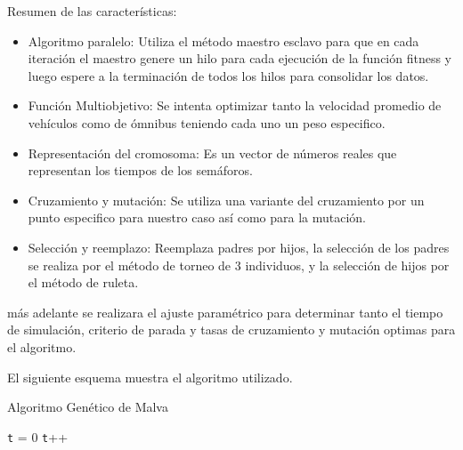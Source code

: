 Resumen de las características:
\begin{itemize}

\item Algoritmo paralelo: Utiliza el método maestro esclavo para que en cada iteración el maestro genere un hilo para cada ejecución  de la función fitness y luego espere a la terminación de todos los hilos para consolidar los datos. 
\item Función Multiobjetivo: Se intenta optimizar tanto la velocidad promedio de vehículos como de ómnibus teniendo cada uno un peso especifico.
\item Representación del cromosoma: Es un vector de números reales que representan los tiempos de los semáforos.
\item Cruzamiento y mutación: Se utiliza una variante del cruzamiento por un punto especifico para nuestro caso así como para la mutación.
\item Selección y reemplazo: Reemplaza padres por hijos, la selección de los padres se realiza por el método de torneo de 3 individuos, y la selección de hijos por el método de ruleta.

\end{itemize}

más adelante se realizara el ajuste paramétrico para determinar tanto el tiempo de simulación, criterio de parada y tasas de cruzamiento y mutación optimas para el algoritmo.

El siguiente esquema muestra el algoritmo utilizado. \citep{MalvaAlgGenetico}

 
\begin{algorithm}[H]
	\caption{Algoritmo Genético de Malva}
	\label{alg:algoritmo_genetico_malva}
	\begin{algorithmic} [1] 
		{
			\STATE \texttt{t} = 0
			\STATE \texttt{t}++		
			\ENDWHILE
		}
	\end{algorithmic}

\end{algorithm}




